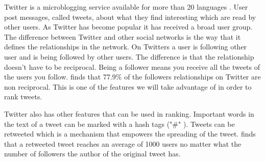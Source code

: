 Twitter is a microblogging service available for more than 20 languages \citep{Twitter2012}. User post messages, called tweets, about what they find interesting which are read by other users. As Twitter has become popular it has received a broad user group. The difference between Twitter and other social networks is the way  that it defines the relationships in the network. On Twitters a user is following other user and is being followed by other users. The difference is that the relationship doesn't have to be reciprocal. Being a follower means you receive all the tweets of the users you follow. \citep{Kwak2010} finds that 77.9\% of the followers relationships on Twitter are non reciprocal. This is one of the features we will take advantage of in order to rank tweets. 



Twitter also has other features that can be used in ranking. Important words in the text of a tweet can be marked with a hash tags ("\#" ). Tweets can be retweeted which is a mechanism that empowers the spreading of the tweet. \citep{Kwak2010} finds that a retweeted tweet reaches an average of 1000 users no matter what the number of followers the author of the original tweet has. 


